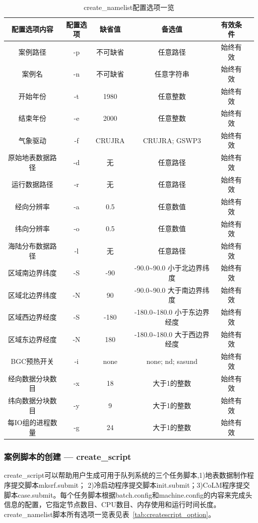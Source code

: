 \begin{table}[!htbp]
\renewcommand{\arraystretch}{1.5}
\centering
\caption{create\_namelist配置选项一览}\label{tab:createnml_option}
\begin{tabular}{
cccccc} \toprule
\textbf{配置选项内容} & \textbf{配置选项} & \textbf{缺省值} & \textbf{备选值} & \textbf{有效条件}\\ \midrule
案例路径 & -p & 不可缺省 & 任意路径 & 始终有效 \\
案例名  & -n & 不可缺省 & 任意字符串 & 始终有效 \\
开始年份 & -t & 1980 & 任意整数 & 始终有效\\
结束年份 & -e & 2000 & 任意整数 & 始终有效\\
气象驱动 & -f & CRUJRA & CRUJRA; GSWP3  & 始终有效\\
原始地表数据路径 & -d & 无 & 任意路径 & 始终有效\\
运行数据路径 & -r & 无 & 任意路径 & 始终有效\\
经向分辨率 & -a & 0.5 & 任意数值 & 始终有效\\
纬向分辨率 & -o & 0.5 & 任意数值 & 始终有效\\
海陆分布数据路径 & -l & 无 & 任意路径 & 始终有效\\
区域南边界纬度 & -S & -90 & -90.0\textasciitilde90.0 小于北边界纬度 & 始终有效\\
区域北边界纬度 & -N & 90 & -90.0\textasciitilde90.0 大于南边界纬度 & 始终有效\\
区域西边界经度 & -S & -180 & -180.0\textasciitilde180.0 小于东边界经度 & 始终有效\\
区域东边界经度 & -N & 180 & -180.0\textasciitilde180.0 大于西边界经度 & 始终有效\\
BGC预热开关 & -i &none & none; nd; sasund& 始终有效 \\
经向数据分块数目 & -x & 18 & 大于1的整数& 始终有效 \\
纬向数据分块数目 & -y & 9 & 大于1的整数& 始终有效 \\
每IO组的进程数量 & -g & 24 & 大于1的整数& 始终有效 \\
\bottomrule
\end{tabular}
\end{table}

\subsubsection{案例脚本的创建 --- create\_script}

create\_script可以帮助用户生成可用于队列系统的三个任务脚本,1)地表数据制作程序提交脚本mksrf.submit； 2)冷启动程序提交脚本init.submit；3)CoLM程序提交脚本case.submit。每个任务脚本根据batch.config和machine.config的内容来完成头信息的配置，它指定节点数目、CPU数目、内存使用和运行时间长度。create\_namelist脚本所有选项一览表见表~\ref{tab:createscript_option}。

